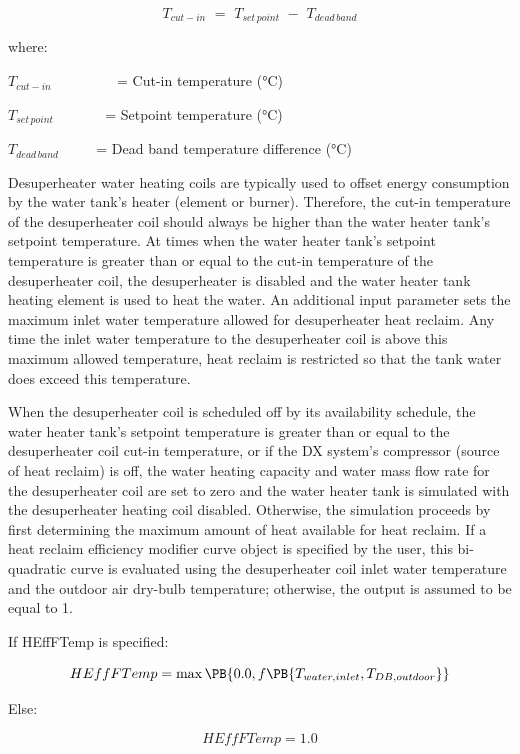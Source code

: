 \begin{equation}
{T_{cut - in}}\,\, = \,\,{T_{set\,point}}\,\, - \,\,{T_{dead\,band}}
\end{equation}

where:

\({T_{cut - in}}\) ~~~~~~~~ = Cut-in temperature (°C)

\({T_{set\,point}}\) ~~~~~~ = Setpoint temperature (°C)

\({T_{dead\,band}}\) ~~~~ = Dead band temperature difference (°C)

Desuperheater water heating coils are typically used to offset energy consumption by the water tank's heater (element or burner). Therefore, the cut-in temperature of the desuperheater coil should always be higher than the water heater tank's setpoint temperature. At times when the water heater tank's setpoint temperature is greater than or equal to the cut-in temperature of the desuperheater coil, the desuperheater is disabled and the water heater tank heating element is used to heat the water. An additional input parameter sets the maximum inlet water temperature allowed for desuperheater heat reclaim. Any time the inlet water temperature to the desuperheater coil is above this maximum allowed temperature, heat reclaim is restricted so that the tank water does exceed this temperature.

When the desuperheater coil is scheduled off by its availability schedule, the water heater tank's setpoint temperature is greater than or equal to the desuperheater coil cut-in temperature, or if the DX system's compressor (source of heat reclaim) is off, the water heating capacity and water mass flow rate for the desuperheater coil are set to zero and the water heater tank is simulated with the desuperheater heating coil disabled. Otherwise, the simulation proceeds by first determining the maximum amount of heat available for heat reclaim. If a heat reclaim efficiency modifier curve object is specified by the user, this bi-quadratic curve is evaluated using the desuperheater coil inlet water temperature and the outdoor air dry-bulb temperature; otherwise, the output is assumed to be equal to 1.

If HEffFTemp is specified:

\begin{equation}
  HEffFTemp = \max\PB{0.0, f\PB{T_{water,inlet},T_{DB,outdoor}}}
\end{equation}

Else:

\begin{equation}
  HEffFTemp = 1.0
\end{equation}

